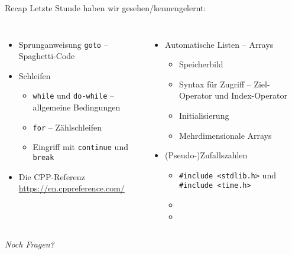
\begin{frame}[t,plain]
\titlepage
\end{frame}


\begin{frame}[fragile]{Recap}
%
Letzte Stunde haben wir gesehen/kennengelernt:
%
\begin{columns}[T]
\begin{itemize}
\item Sprunganweisung \texttt{goto} -- Spaghetti-Code
\item Schleifen
	\begin{itemize}
	\item \texttt{while} und \texttt{do-while} -- allgemeine Bedingungen
	\item \texttt{for} -- Zählschleifen
	\item Eingriff mit \texttt{continue} und \texttt{break}
	\end{itemize}
\item Die CPP-Referenz \url{https://en.cppreference.com/}
\end{itemize}
%
\begin{itemize}
\item Automatische Listen -- Arrays
	\begin{itemize}
	\item Speicherbild
	\item Syntax für Zugriff -- Ziel-Operator und Index-Operator
	\item Initialisierung
	\item Mehrdimensionale Arrays
	\end{itemize}
\item (Pseudo-)Zufallszahlen
	\begin{itemize}
	\item \texttt{#include <stdlib.h>} und \texttt{#include <time.h>}
	\item {}
	\item {}
	\end{itemize}
\end{itemize}
\end{columns}
%
\begin{center}
\emph{Noch Fragen?}
\end{center}
%
\end{frame}


